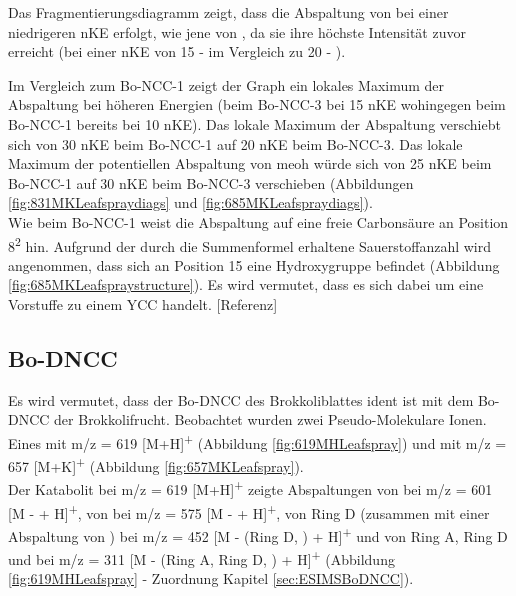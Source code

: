 Das Fragmentierungsdiagramm zeigt, dass die Abspaltung von  bei einer niedrigeren \gls{nKE} erfolgt, wie jene von , da sie ihre höchste Intensität zuvor erreicht (bei einer \gls{nKE} von 15 -  im Vergleich zu 20 - ). 

Im Vergleich zum Bo-NCC-1 zeigt der Graph ein lokales Maximum der  Abspaltung bei höheren Energien (beim Bo-NCC-3 bei 15 \gls{nKE} wohingegen beim Bo-NCC-1 bereits bei 10 \gls{nKE}). Das lokale Maximum der  Abspaltung verschiebt sich von 30 \gls{nKE} beim Bo-NCC-1 auf 20 \gls{nKE} beim Bo-NCC-3. Das lokale Maximum der potentiellen Abspaltung von \gls{meoh} würde sich von 25 \gls{nKE} beim Bo-NCC-1 auf 30 \gls{nKE} beim Bo-NCC-3 verschieben (Abbildungen \ref{fig:831MKLeafspraydiags} und \ref{fig:685MKLeafspraydiags}).\\ 

Wie beim Bo-NCC-1 weist die  Abspaltung auf eine freie Carbonsäure an Position 8\textsuperscript{2} hin. Aufgrund der durch die Summenformel erhaltene Sauerstoffanzahl wird angenommen, dass sich an Position 15 eine Hydroxygruppe befindet (Abbildung \ref{fig:685MKLeafspraystructure}). Es wird vermutet, dass es sich dabei um eine Vorstuffe zu einem \gls{YCC} handelt. [Referenz]

\subsection{Bo-DNCC}

Es wird vermutet, dass der Bo-DNCC des Brokkoliblattes ident ist mit dem Bo-DNCC der Brokkolifrucht. \cite{ChlorophyllCatabolitesBroccoli} Beobachtet wurden zwei Pseudo-Molekulare Ionen. Eines mit m/z = 619 [M+H]\textsuperscript{+} (Abbildung \ref{fig:619MHLeafspray}) und mit m/z = 657 [M+K]\textsuperscript{+} (Abbildung \ref{fig:657MKLeafspray}).\\

Der Katabolit bei m/z = 619 [M+H]\textsuperscript{+} zeigte Abspaltungen von  bei m/z = 601 [M -  + H]\textsuperscript{+}, von  bei m/z = 575 [M -  + H]\textsuperscript{+}, von Ring D (zusammen mit einer Abspaltung von ) bei m/z = 452 [M - (Ring D, ) + H]\textsuperscript{+} und von Ring A, Ring D und  bei m/z = 311 [M - (Ring A, Ring D, ) + H]\textsuperscript{+} (Abbildung \ref{fig:619MHLeafspray} - Zuordnung Kapitel \ref{sec:ESIMSBoDNCC}).

